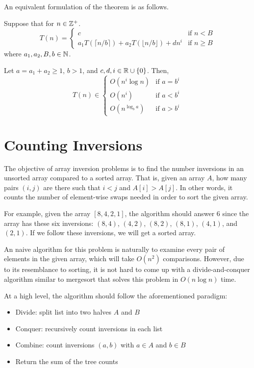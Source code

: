 An equivalent formulation of the theorem is as follows.

\begin{theorem}
    Suppose that for $n \in \mathbb{Z}^+$.
    \begin{equation*}
        T(n) =
        \begin{cases}
        c & \text{if $n<B$} \\
        a_1 T(\lceil n/b \rceil) + a_2 T(\lfloor n/b \rfloor) + dn^i & \text{if $n\geq B$}
        \end{cases}
    \end{equation*}
    where $a_1, a_2, B, b \in \mathbb{N}$.
    
    Let $a = a_1+a_2 \geq 1$, $b>1$, and $c,d,i \in \mathbb{R} \cup \{0\}$. Then,
    \begin{equation*}
        T(n) \in
        \begin{cases}
        O(n^i \log n) & \text{if $a=b^i$} \\
        O(n^i) & \text{if $a < b^i$} \\
        O(n^{\log_b a}) & \text{if $a > b^i$}
        \end{cases}
    \end{equation*}
\end{theorem}

\section{Counting Inversions}

The objective of array inversion problems is to find the number inversions in an unsorted array compared to a sorted array. That is, given an array $A$, how many pairs $(i,j)$ are there such that $i < j$ and $A[i] > A[j]$. In other words, it counts the number of element-wise swaps needed in order to sort the given array.

For example, given the array $[8,4,2,1]$, the algorithm should answer 6 since the array has these six inversions: $(8,4)$, $(4,2)$, $(8,2)$, $(8,1)$, $(4,1)$, and $(2,1)$. If we follow these inversions, we will get a sorted array.

An naive algorithm for this problem is naturally to examine every pair of elements in the given array, which will take $O(n^2)$ comparisons. However, due to its resemblance to sorting, it is not hard to come up with a divide-and-conquer algorithm similar to mergesort that solves this problem in $O(n\log n)$ time.

At a high level, the algorithm should follow the aforementioned paradigm:
\begin{itemize}
    \item Divide: split list into two halves $A$ and $B$ 
    \item Conquer: recursively count inversions in each list
    \item Combine: count inversions $(a,b)$ with $a \in A$ and $b \in B$ 
    \item Return the sum of the tree counts
\end{itemize}

